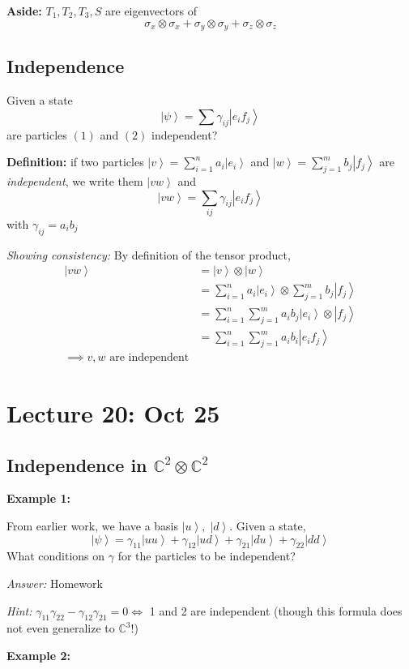 \documentclass[12pt]{article}
\newcommand{\C}{\mathbb{C}}
\newcommand{\ket}[1]{\left\vert #1 \right\rangle}
\begin{document}
    \textbf{Aside:} $T_1, T_2, T_3, S$ are eigenvectors of 
    \[\sigma_x \otimes \sigma_x + \sigma_y \otimes \sigma_y + \sigma_z \otimes \sigma_z\]

\subsection*{Independence}
    Given a state 
    \[\ket \psi = \sum \gamma_{ij} \ket{e_i f_j}\]
    are particles $(1)$ and $(2)$ independent?

    \textbf{Definition:} if two particles $\ket v = \sum_{i=1}^n a_i \ket{e_i}$ and $\ket w = \sum_{j=1}^m b_j \ket{f_j}$ are \emph{independent}, we write them $\ket{vw}$
    and 
    \[\ket{vw} = \sum_{ij} \gamma_{ij} \ket{e_i f_j}\]
    with $\gamma_{ij} = a_i b_j$

    \emph{Showing consistency:} By definition of the tensor product, 
        \begin{align*}
            \ket{vw} &= \ket{v} \otimes \ket{w}\\
            &= \sum_{i=1}^n a_i \ket{e_i} \otimes \sum_{j=1}^m b_j \ket{f_j}\\
            &= \sum_{i=1}^n \sum_{j=1}^m a_i b_j \ket{e_i} \otimes \ket{f_j}\\
            &= \sum_{i=1}^n \sum_{j=1}^m a_i b_i \ket{e_i f_j}\\
            \implies v, w \text{ are independent}
        \end{align*}

   
\section*{Lecture 20: Oct 25}
\subsection*{Independence in $\C^2 \otimes \C^2$}
\textbf{Example 1:}

    From earlier work, we have a basis $\ket{u}, \; \ket{d}$. Given a state, 
    \[\ket{\psi} = \gamma_{11} \ket{uu} + \gamma_{12} \ket{ud} + \gamma_{21} \ket{du} + \gamma_{22} \ket{dd}\]
    What conditions on $\gamma$ for the particles to be independent? 

    \emph{Answer:} Homework 

    \emph{Hint:} $\gamma_{11} \gamma_{22} - \gamma_{12}\gamma_{21} = 0 \iff $ 1 and 2 are independent (though this formula does not even generalize to $\C^3$!)

\textbf{Example 2:}
\end{document}
